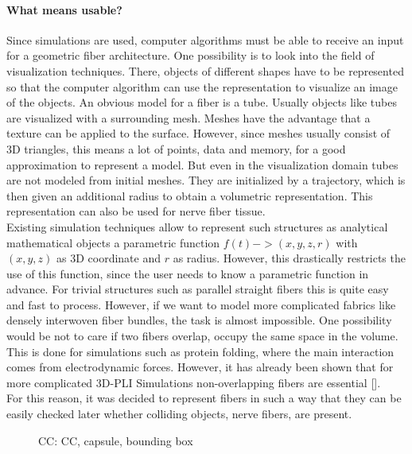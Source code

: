 \paragraph{What means usable?}
Since simulations are used, computer algorithms must be able to receive an input for a geometric fiber architecture.
One possibility is to look into the field of visualization techniques.
There, objects of different shapes have to be represented so that the computer algorithm can use the representation to visualize an image of the objects.
An obvious model for a fiber is a tube.
Usually objects like tubes are visualized with a surrounding mesh.
Meshes have the advantage that a texture can be applied to the surface.
However, since meshes usually consist of 3D triangles, this means a lot of points, \ie data and memory, for a good approximation to represent a model.
But even in the visualization domain tubes are not modeled from initial meshes.
They are initialized by a trajectory, which is then given an additional radius to obtain a volumetric representation.
This representation can also be used for nerve fiber tissue.
\\
% 
Existing simulation techniques \dummy allow to represent such structures as analytical mathematical objects \eg a parametric function $f(t) -> (x,y,z,r)$ with $(x,y,z)$ as 3D coordinate and $r$ as radius.
However, this drastically restricts the use of this function, since the user needs to know a parametric function in advance.
For trivial structures such as parallel straight fibers this is quite easy and fast to process.
However, if we want to model more complicated fabrics like densely interwoven fiber bundles, the task is almost impossible.
One possibility would be not to care if two fibers overlap, \ie occupy the same space in the volume.
This is done \eg for simulations such as protein folding, where the main interaction comes from electrodynamic forces.
However, it has already been shown that for more complicated \ac{3D-PLI} Simulations non-overlapping fibers are essential [\dummy].
\\
% 
For this reason, it was decided to represent fibers in such a way that they can be easily checked later whether colliding objects, \ie nerve fibers, are present.
\\
% 
\begin{figure}[!t]
    \centering
    \setlength{\tikzwidth}{0.75\textwidth}
    \tikzset{external/export=false}
	\caption[cc and co]{\Acf{CC}:  \ac{CC},  capsule,  bounding box}
	\label{fig:conical_capsule}
\end{figure}
